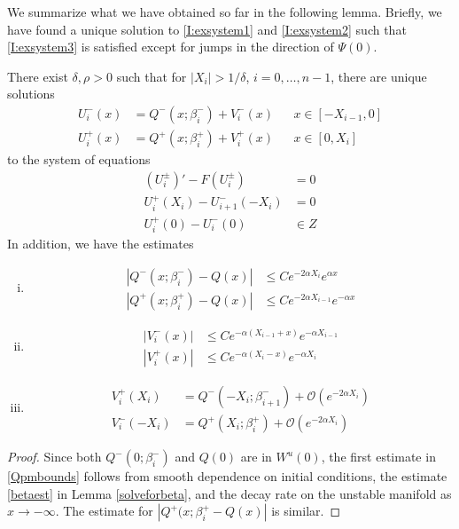 \documentclass[thesis.tex]{subfiles}
\begin{document}
We summarize what we have obtained so far in the following lemma. Briefly, we have found a unique solution to \eqref{I:exsystem1} and \eqref{I:exsystem2} such that \eqref{I:exsystem3} is satisfied except for jumps in the direction of $\Psi(0)$.


\begin{lemma}\label{solvewithjumps}
There exist $\delta, \rho > 0$ such that for $|X_i| > 1/\delta$, $i = 0, \dots, n-1$, there are unique solutions
\begin{equation*}
\begin{aligned}
U_i^-(x) &= Q^-(x; \beta_i^-) + V_i^-(x) && x \in [-X_{i-1}, 0] \\
U_i^+(x) &= Q^+(x; \beta_i^+) + V_i^+(x) && x \in [0, X_i]
\end{aligned}
\end{equation*}
to the system of equations
\begin{equation}\label{systemwithjumpZ}
\begin{aligned}
(U_i^\pm)' - F(U_i^\pm) &= 0 \\
U_i^+(X_i) - U_{i+1}^-(-X_i) &= 0 \\
U_i^+(0) - U_i^-(0) &\in Z 
\end{aligned}
\end{equation}
In addition, we have the estimates
\begin{enumerate}[(i)]
\item 
\begin{equation}
\begin{aligned}\label{Qpmbounds}
|Q^-(x; \beta_i^-) - Q(x)| &\leq C e^{-2 \alpha X_i} e^{\alpha x} \\
|Q^+(x; \beta_i^+) - Q(x)| &\leq C e^{-2 \alpha X_{i-1}} e^{-\alpha x}
\end{aligned}
\end{equation}
\item
\begin{equation}\label{Vpmbounds}
\begin{aligned}
|V_i^-(x)| &\leq C e^{-\alpha(X_{i-1} + x)}e^{-\alpha X_{i-1}} \\
|V_i^+(x)| &\leq C e^{-\alpha(X_i - x)}e^{-\alpha X_i} 
\end{aligned}
\end{equation}
\item
\begin{equation}\label{VQpm}
\begin{aligned}
V_i^+(X_i) &= Q^-(-X_i; \beta_{i+1}^-) + \mathcal{O}(e^{-2 \alpha X_i}) \\
V_i^-(-X_i) &= Q^+(X_i; \beta_i^+) + \mathcal{O}(e^{-2 \alpha X_i})
\end{aligned}
\end{equation}
\end{enumerate}
\begin{proof}
Since both $Q^-(0; \beta_i^-)$ and $Q(0)$ are in $W^u(0)$, the first estimate in \eqref{Qpmbounds} follows from smooth dependence on initial conditions, the estimate \eqref{betaest} in Lemma \ref{solveforbeta},  and the decay rate on the unstable manifold as $x \rightarrow -\infty$. The estimate for $|Q^+(x; \beta_i^+ - Q(x)|$ is similar.


\end{proof}
\end{lemma}
\end{document}
